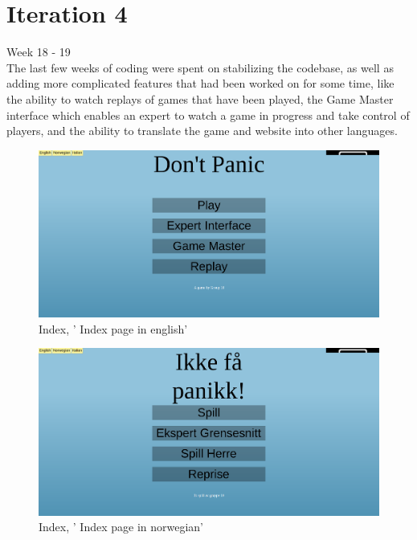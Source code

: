 \section{Iteration 4}

Week 18 - 19\\
\newline
The last few weeks of coding were spent on stabilizing the codebase, as well as adding more complicated features that had been worked on for some time, like the ability to watch replays of games that have been played, the Game Master interface which enables an expert to watch a game in progress and take control of players, and the ability to translate the game and website into other languages.\\



\begin{figure}[H]
  \centering
    \includegraphics[width=1.0\textwidth]{img/indexen.png}
  \caption{Index, ' Index page in english'} 
  \label{fig:indexen}
\end{figure}

\begin{figure}[H]
  \centering
    \includegraphics[width=1.0\textwidth]{img/indexno.png}
  \caption{Index, ' Index page in norwegian'} 
  \label{fig:indexno}
\end{figure}


